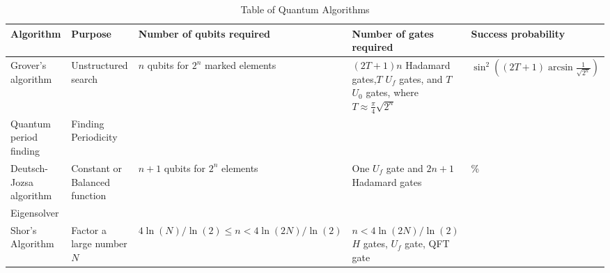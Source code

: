 \begin{center}
\begin{table}[H]
\begin{tabular}{|>{\centering\arraybackslash}m{}|>{\centering\arraybackslash}m{}|>{\centering\arraybackslash}m{}|>{\centering\arraybackslash}m{}|>{\centering\arraybackslash}m{}|}
    \hline
    \textbf{Algorithm} & \textbf{Purpose} & \textbf{Number of qubits required} & \textbf{Number of gates required} & \textbf{Success probability}\\
    
    \hline
    
    Grover's algorithm & Unstructured search & $n$ qubits for $2^n$ marked elements & $(2T+1)n$ Hadamard gates,$T$ $U_f$ gates, and $T$ $U_0$ gates, where $T \approx \frac{\pi}{4} \sqrt{2^n}$ & $\sin^2((2T+1)\arcsin{\frac{1}{\sqrt{2^n}}})$\\
    \hline
    
    Quantum period finding & Finding Periodicity & & & \\
    \hline
    
    Deutsch-Jozsa algorithm & Constant or Balanced function & $n+1$ qubits for $2^n$ elements & One $U_{f}$ gate and $2n+1$ Hadamard gates & 100\% \\
    \hline
    
    Eigensolver & & & & \\
    \hline
    
    Shor's Algorithm & Factor a large number $N$ & $4\ln(N)/\ln(2) \leq n < 4\ln(2N)/\ln(2)$ & $n < 4\ln(2N)/\ln(2)$ $H$ gates, $U_f$ gate, QFT gate &\\
    \hline 
    
    \end{tabular}
\caption {Table of Quantum Algorithms} 
\end{table}
\label{AlgorithmTable} 
\end{center}



